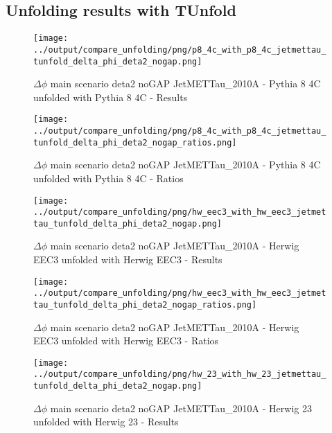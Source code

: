 \documentclass[11pt]{book}
\begin{document}
\clearpage
\subsection{Unfolding results with TUnfold}

\begin{figure}[ht]
\centering
\texttt{[image: ../output/compare\_unfolding/png/p8\_4c\_with\_p8\_4c\_jetmettau\_tunfold\_delta\_phi\_deta2\_nogap.png]}
\caption{$\Delta\phi$ main scenario deta2 noGAP JetMETTau\_2010A - Pythia 8 4C unfolded with Pythia 8 4C - Results}
\label{p8_p8_jetmettau_tunfold_delta_phi_deta2_nogap_a}
\end{figure}

\begin{figure}[ht]
\centering
\texttt{[image: ../output/compare\_unfolding/png/p8\_4c\_with\_p8\_4c\_jetmettau\_tunfold\_delta\_phi\_deta2\_nogap\_ratios.png]}
\caption{$\Delta\phi$ main scenario deta2 noGAP JetMETTau\_2010A - Pythia 8 4C unfolded with Pythia 8 4C - Ratios}
\label{p8_p8_jetmettau_tunfold_delta_phi_deta2_nogap_b}
\end{figure}

\begin{figure}[ht]
\centering
\texttt{[image: ../output/compare\_unfolding/png/hw\_eec3\_with\_hw\_eec3\_jetmettau\_tunfold\_delta\_phi\_deta2\_nogap.png]}
\caption{$\Delta\phi$ main scenario deta2 noGAP JetMETTau\_2010A - Herwig EEC3 unfolded with Herwig EEC3 - Results}
\label{hw_eec3_hw_eec3_jetmettau_tunfold_delta_phi_deta2_nogap_a}
\end{figure}

\begin{figure}[ht]
\centering
\texttt{[image: ../output/compare\_unfolding/png/hw\_eec3\_with\_hw\_eec3\_jetmettau\_tunfold\_delta\_phi\_deta2\_nogap\_ratios.png]}
\caption{$\Delta\phi$ main scenario deta2 noGAP JetMETTau\_2010A - Herwig EEC3 unfolded with Herwig EEC3 - Ratios}
\label{hw_eec3_hw_eec3_jetmettau_tunfold_delta_phi_deta2_nogap_b}
\end{figure}

\begin{figure}[ht]
\centering
\texttt{[image: ../output/compare\_unfolding/png/hw\_23\_with\_hw\_23\_jetmettau\_tunfold\_delta\_phi\_deta2\_nogap.png]}
\caption{$\Delta\phi$ main scenario deta2 noGAP JetMETTau\_2010A - Herwig 23 unfolded with Herwig 23 - Results}
\label{hw_23_hw_23_jetmettau_tunfold_delta_phi_deta2_nogap_a}
\end{figure}
\end{document}
